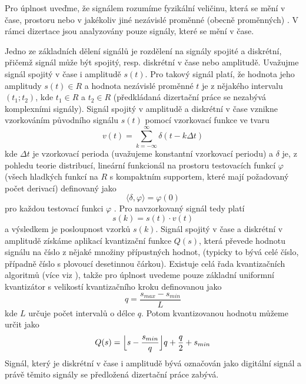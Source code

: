 Pro úplnost uveďme, že signálem rozumíme fyzikální veličinu, která se mění v čase, prostoru nebo v jakékoliv jiné nezávislé proměnné (obecně proměnných) \cite{proakis}. V rámci dizertace jsou analyzovány pouze signály, které se mění v čase.
\par
Jedno ze základních dělení signálů je rozdělení na signály spojité a diskrétní, přičemž signál může být spojitý, resp. diskrétní v čase nebo amplitudě. Uvažujme signál spojitý v čase i amplitudě $s(t)$. Pro takový signál platí, že hodnota jeho amplitudy $s(t)\in R$ a hodnota nezávislé proměnné $t$ je z nějakého intervalu $(t_1;t_2)$, kde $t_1 \in R$ a $t_2 \in R$ (předkládaná dizertační práce se nezabývá komplexními signály). Signál spojitý v amplitudě a diskrétní v čase vznikne vzorkováním původního signálu $s(t)$ pomocí vzorkovací funkce ve tvaru
\begin{equation}
v(t)=\sum_{k=-\infty}^{\infty}\delta(t-k\Delta t)
\end{equation}
kde $\Delta t$ je vzorkovací perioda (uvažujeme konstantní vzorkovací periodu) a $\delta$ je, z pohledu teorie distribucí, lineární funkcionál na prostoru testovacích funkcí $\varphi$ (všech hladkých funkcí na $R$ s kompaktním supportem, které mají požadovaný počet derivací) definovaný jako
\begin{equation}
\langle \delta,\varphi\rangle=\varphi(0)
\end{equation}
pro každou testovací funkci $\varphi$ \cite{dirac}. Pro navzorkovaný signál tedy platí
\begin{equation}
s(k)=s(t)\cdot v(t)
\end{equation}
a výsledkem je posloupnost vzorků $s(k)$. Signál spojitý v čase a diskrétní v amplitudě získáme aplikací kvantizační funkce $Q(s)$, která převede hodnotu signálu  na číslo z nějaké množiny přípustných hodnot, (typicky to bývá celé číslo, případně číslo s plovoucí desetinnou čárkou). Existuje celá řada kvantizačních algoritmů (více viz \cite{kvantizace}), takže pro úplnost uvedeme pouze základní uniformní kvantizátor s velikostí kvantizačního kroku definovanou jako
\begin{equation}
q=\frac{s_{max}-s_{min}}{L}
\end{equation}
kde $L$ určuje počet intervalů o délce $q$. Potom kvantizovanou hodnotu můžeme určit jako
\begin{equation}
Q(s)=\Bigl \lfloor s-\frac{s_{min}}{q}\Bigr \rfloor q+\frac{q}{2}+s_{min}
\end{equation}
Signál, který je diskrétní v čase i amplitudě bývá označován jako digitální signál a právě těmito signály se předložená dizertační práce zabývá.

